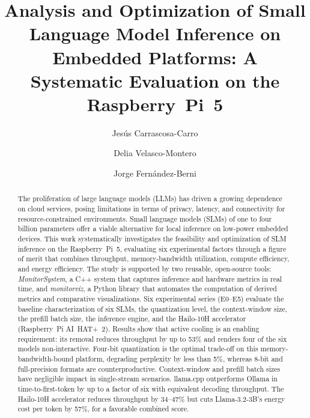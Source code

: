 \documentclass[acmsmall,natbib=false]{acmart}
\begin{document}
\title[SLM Inference on Embedded Platforms]{Analysis and Optimization of Small
Language Model Inference on Embedded Platforms: A Systematic Evaluation on the
Raspberry~Pi~5}

\author{Jesús Carrascosa-Carro}

\author{Delia Velasco-Montero}

\author{Jorge Fernández-Berni}

\renewcommand{\shortauthors}{Carrascosa-Carro et al.}

\begin{abstract}
The proliferation of large language models (LLMs) has driven a growing
dependence on cloud services, posing limitations in terms of privacy, latency,
and connectivity for resource-constrained environments. Small language models
(SLMs) of one to four billion parameters offer a viable alternative for local
inference on low-power embedded devices. This work systematically investigates
the feasibility and optimization of SLM inference on the Raspberry~Pi~5,
evaluating six experimental factors through a figure of merit that combines
throughput, memory-bandwidth utilization, compute efficiency, and energy
efficiency. The study is supported by two reusable, open-source tools:
\textit{MonitorSystem}, a C++ system that captures inference and hardware
metrics in real time, and \textit{monitorviz}, a Python library that automates
the computation of derived metrics and comparative visualizations. Six
experimental series (E0--E5) evaluate the baseline characterization of six
SLMs, the quantization level, the context-window size, the prefill batch size,
the inference engine, and the Hailo-10H accelerator (Raspberry~Pi AI~HAT+~2). Results show
that active cooling is an enabling requirement: its removal reduces throughput
by up to 53\% and renders four of the six models non-interactive. Four-bit
quantization is the optimal trade-off on this memory-bandwidth-bound platform,
degrading perplexity by less than 5\%, whereas 8-bit and full-precision
formats are counterproductive. Context-window and prefill batch sizes have
negligible impact in single-stream scenarios. llama.cpp outperforms Ollama in
time-to-first-token by up to a factor of six with equivalent decoding
throughput. The Hailo-10H accelerator reduces throughput by 34--47\% but cuts
Llama-3.2-3B's energy cost per token by 57\%, for a favorable combined
score.
\end{abstract}
\end{document}

